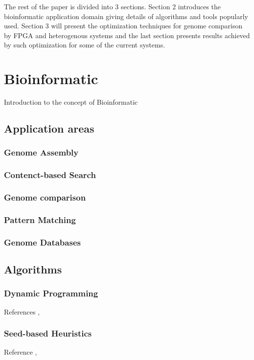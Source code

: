 \documentclass[12pt,twoside]{article}
\begin{document}
The rest of the paper is divided into 3 sections. Section 2 introduces the bioinformatic application domain giving
details of algorithms and tools popularly used. Section 3 will present the optimization techniques for genome
comparison by FPGA and heterogenous systems and the last section presents results achieved by such optimization
for some of the current systems.

\section {Bioinformatic}

Introduction to the concept of Bioinformatic

\subsection{Application areas}
\subsubsection{Genome Assembly}
\subsubsection{Contenct-based Search}
\subsubsection{Genome comparison}
\subsubsection{Pattern Matching}
\subsubsection{Genome Databases}

\subsection{Algorithms}
\subsubsection{Dynamic Programming}
References \cite{rucci_smith-waterman_2014}, \cite{smith_identification_1981}
\subsubsection{Seed-based Heuristics}
Reference \cite{mahram_fast_2010}, \cite{altschul_basic_1990}
\end{document}
